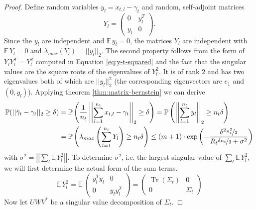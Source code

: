 \documentclass[10pt,a4paper]{article}
\DeclareMathOperator{\Tr}{Tr}
\begin{document}
\begin{proof}
  Define random variables $y_{l} = x_{t, l} - \gamma_{t}$ and random, self-adjoint matrices
  \begin{equation*}
    Y_{l} = \begin{pmatrix}
      0 & y_{l}^{T}\\
      y_{l} & 0
    \end{pmatrix}.
  \end{equation*}
  Since the $y_{l}$ are independent and $\mathbb{E}\,y_{l} = 0$, the matrices $Y_{l}$ are independent with $\mathbb{E}\,Y_{l} = 0$ and $\lambda_{max}(Y_{l}) = ||y_{l}||_{2}$.
  The second property follows from the form of $Y_{l}Y_{l}^{T} = Y_{l}^{2}$ computed in Equation \eqref{eq:y-t-squared} and the fact that the singular values are the square roots of the eigenvalues of $Y_{l}^{2}$.
  It is of rank $2$ and has two eigenvalues both of which are $||y_{l}||_{2}^{2}$ (the corresponding eigenvectors are $e_{1}$ and $(0, y_{l})$).
  Applying theorem \ref{thm:matrix-bernstein} we can derive
  \begin{align*}
    \mathbb{P}(||\tilde{\gamma}_{t} - \gamma_{t}||_{2} \ge \delta) & = \mathbb{P}\left( \frac{1}{n_{t}} \left|\left| \sum_{l = 1}^{n_{t}} x_{t, l} - \gamma_{t} \right|\right|_{2} \ge \delta \right) = \mathbb{P}\left( \left|\left| \sum_{l = 1}^{n_{t}} y_{l} \right|\right|_{2} \ge n_{t}\delta \right)\\
    & = \mathbb{P}\left( \lambda_{max}\left( \sum_{l = 1}^{n_{t}} Y_{l} \right) \ge n_{t}\delta \right) \le (m + 1) \cdot \exp\left( -\frac{\delta^{2} \nicefrac{n_{t}^{2}}{2}}{R_{t} \nicefrac{\delta n_{t}}{3} + \sigma^{2}} \right)
  \end{align*}
  with $\sigma^{2} = \left|\left| \sum_{l} \mathbb{E}\, Y_{l}^{2} \right|\right|$.
  To determine $\sigma^{2}$, i.e. the largest singular value of $\sum_{l} \mathbb{E}\,Y_{l}^{2}$, we will first determine the actual form of the sum terms.
  \begin{equation}
    \mathbb{E}\,Y_{l}^{2} = \mathbb{E}\,\begin{pmatrix}
      y_{l}^{T}y_{l} & 0\\
      0 & y_{l}y_{l}^{T}
    \end{pmatrix}
    = \begin{pmatrix}
      \Tr(\Sigma_{t}) & 0\\
      0 & \Sigma_{t}
    \end{pmatrix}
    \label{eq:y-t-squared}
  \end{equation}
  Now let $UWV^{*}$ be a singular value decomposition of $\Sigma_{t}$.

\end{proof}
\end{document}
